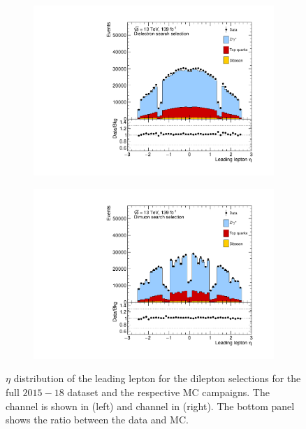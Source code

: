 \begin{figure}[]
    \centering
    \begin{subfigure}[b]{0.49\textwidth}
        \centering
        \includegraphics[width=\textwidth]{figures/analysis/datamc/dataMCcompare/ee_eta1.pdf}
        \label{fig:datamc:eeeta1}
    \end{subfigure}
    \begin{subfigure}[b]{0.49\textwidth}
        \centering
        \includegraphics[width=\textwidth]{figures/analysis/datamc/dataMCcompare/uu_eta1.pdf}
        \label{fig:datamc:uueta1}
    \end{subfigure}
    \caption[$\eta$ distribution of the leading lepton for the dilepton selections for the full $2015-18$ dataset and the respective MC campaigns.]{$\eta$ distribution of the leading lepton for the dilepton selections for the full $2015-18$ dataset and the respective MC campaigns. The \ee channel is shown in (left) and \mumu channel in (right). The bottom panel shows the ratio between the data and MC.}
    \label{fig:datamc:eta1}
\end{figure}

